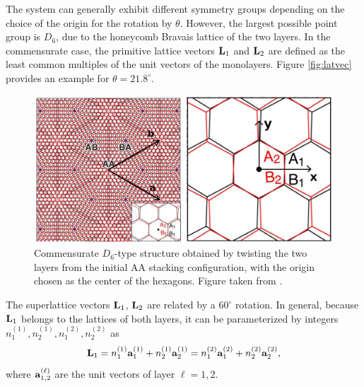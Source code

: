 The system can generally exhibit different symmetry groups depending on the choice of the origin for the rotation by \( \theta \). However, the largest possible point group is \( D_6 \), due to the honeycomb Bravais lattice of the two layers. In the commensurate case, the primitive lattice vectors \( \vb{L}_1 \) and \( \vb{L}_2 \) are defined as the least common multiples of the unit vectors of the monolayers. Figure \ref{fig:latvec} provides an example for \( \theta = 21.8^\circ \).
\begin{figure}[H]
\centering
\includegraphics[height=.32\columnwidth]{fig/moireD6.png}
\caption{Commensurate $D_6$-type structure obtained by twisting the two layers from the initial AA stacking configuration, with the origin chosen as the center of the hexagons. Figure taken from \cite{thesis_rennella}.}
\label{fig:moireD6}
\end{figure}


The superlattice vectors $\vb{L}_1$, $\vb{L}_2$ are related by a $60^\circ$ rotation. In general, because $\vb{L}_1$ belongs to the lattices of both layers, it can be parameterized by integers $n_1^{(1)}, n_2^{(1)}, n_1^{(2)}, n_2^{(2)}$ as
\begin{equation} \label{eq:L1}
\vb{L}_1 = n_1^{(1)}\vb{a}_1^{(1)} + n_2^{(1)}\vb{a}_2^{(1)} = n_1^{(2)}\vb{a}_1^{(2)} + n_2^{(2)}\vb{a}_2^{(2)},
\end{equation}
where $\vb{a}_{1,2}^{(\ell)}$ are the unit vectors of layer $\ell = 1,2$.

